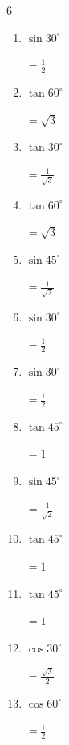 \begin{multicols}{6}
\begin{enumerate}
  \item $\displaystyle \sin{30^\circ}$

        $\displaystyle =\frac{1}{2}$

  \item $\displaystyle \tan{60^\circ}$

        $\displaystyle =\sqrt{3}$

  \item $\displaystyle \tan{30^\circ}$

        $\displaystyle =\frac{1}{\sqrt{3}}$

  \item $\displaystyle \tan{60^\circ}$

        $\displaystyle =\sqrt{3}$

  \item $\displaystyle \sin{45^\circ}$

        $\displaystyle =\frac{1}{\sqrt{2}}$

  \item $\displaystyle \sin{30^\circ}$

        $\displaystyle =\frac{1}{2}$

  \item $\displaystyle \sin{30^\circ}$

        $\displaystyle =\frac{1}{2}$

  \item $\displaystyle \tan{45^\circ}$

        $\displaystyle =1$

  \item $\displaystyle \sin{45^\circ}$

        $\displaystyle =\frac{1}{\sqrt{2}}$

\columnbreak %

  \item $\displaystyle \tan{45^\circ}$

        $\displaystyle =1$

  \item $\displaystyle \tan{45^\circ}$

        $\displaystyle =1$

  \item $\displaystyle \cos{30^\circ}$

        $\displaystyle =\frac{\sqrt{3}}{2}$

  \item $\displaystyle \cos{60^\circ}$

        $\displaystyle =\frac{1}{2}$


\end{enumerate}
\end{multicols}
